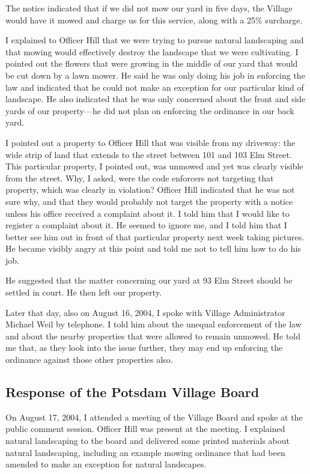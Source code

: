 \documentclass[12pt]{article}
\begin{document}
The notice indicated that if we did not mow our yard in five days, the Village would have it mowed and charge us for this service, along with a 25\% surcharge.

I explained to Officer Hill that we were trying to pursue natural landscaping and that mowing would effectively destroy the landscape that we were cultivating.
I pointed out the flowers that were growing in the middle of our yard that would be cut down by a lawn mower.
He said he was only doing his job in enforcing the law and indicated that he could not make an exception for our particular kind of landscape.
He also indicated that he was only concerned about the front and side yards of our property---he did not plan on enforcing the ordinance in our back yard.

I pointed out a property to Officer Hill that was visible from my driveway:  the wide strip of land that extends to the street between 101 and 103 Elm Street.
This particular property, I pointed out, was unmowed and yet was clearly visible from the street.
Why, I asked, were the code enforcers not targeting that property, which was clearly in violation?
Officer Hill indicated that he was not sure why, and that they would probably not target the property with a notice unless his office received a complaint about it.
I told him that I would like to register a complaint about it.
He seemed to ignore me, and I told him that I better see him out in front of that particular property next week taking pictures.
He became visibly angry at this point and told me not to tell him how to do his job.

He suggested that the matter concerning our yard at 93 Elm Street should be settled in court.
He then left our property.

Later that day, also on August 16, 2004, I spoke with Village Administrator Michael Weil by telephone.
I told him about the unequal enforcement of the law and about the nearby properties that were allowed to remain unmowed.
He told me that, as they look into the issue further, they may end up enforcing the ordinance against those other properties also.

\subsection{Response of the Potsdam Village Board}

On August 17, 2004, I attended a meeting of the Village Board and spoke at the public comment session.
Officer Hill was present at the meeting.
I explained natural landscaping to the board and delivered some printed materials about natural landscaping, including an example mowing ordinance that had been amended to make an exception for natural landscapes.
\end{document}
